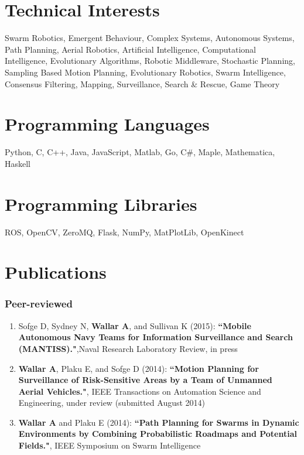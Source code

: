 \documentclass[line,margin]{cv}
\begin{document}
\begin{resume}
\section{Technical Interests}
    Swarm Robotics, Emergent Behaviour, Complex Systems, Autonomous
    Systems, Path Planning, Aerial Robotics, Artificial Intelligence,
    Computational Intelligence, Evolutionary Algorithms, Robotic Middleware,
    Stochastic Planning, Sampling Based Motion Planning, Evolutionary Robotics,
    Swarm Intelligence, Consensus Filtering, Mapping, Surveillance, Search \&
    Rescue, Game Theory

\section{Programming Languages}
    Python, C, C++, Java, JavaScript, Matlab, Go, C\#, Maple,
    Mathematica, Haskell

\section{Programming Libraries}
    ROS, OpenCV, ZeroMQ, Flask, NumPy, MatPlotLib, OpenKinect

\section{Publications}

\subsubsection{Peer-reviewed}

\begin{enumerate}

    \item Sofge D, Sydney N, \textbf{Wallar A}, and Sullivan K (2015):
        \textbf{``Mobile Autonomous Navy Teams for Information Surveillance
        and Search (MANTISS)."},Naval Research Laboratory Review, in press

    \item \textbf{Wallar A}, Plaku E, and Sofge D (2014): \textbf{``Motion
        Planning for Surveillance of Risk-Sensitive Areas by a Team of
        Unmanned Aerial Vehicles."}, IEEE Transactions on Automation Science
        and Engineering, under review (submitted August 2014)

    \item \textbf{Wallar A} and Plaku E (2014): \textbf{``Path Planning for
        Swarms in Dynamic Environments by Combining Probabilistic Roadmaps
        and Potential Fields."}, IEEE Symposium on Swarm Intelligence


\end{enumerate}
\end{resume}
\end{document}
